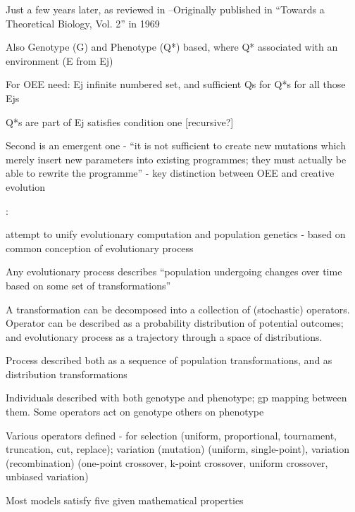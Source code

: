 Just a few years later, 
\autocite{Waddington2008} as reviewed in \autocite{Taylor:1999sc}--Originally published in ``Towards a Theoretical Biology, Vol. 2'' in 1969

Also Genotype (G) and Phenotype (Q*) based, where Q* associated with
an environment (E from Ej)

For OEE need: Ej infinite numbered set, and sufficient Qs for Q*s
for all those Ejs

Q*s are part of Ej satisfies condition one {[}recursive?{]}

Second is an emergent one - ``it is not sufficient to create new
mutations which merely insert new parameters into existing
programmes; they must actually be able to rewrite the programme''
- key distinction between OEE and creative evolution

\autocite{Paixao2015}:

	attempt to unify evolutionary computation and population genetics -
	based on common conception of evolutionary process


	Any evolutionary process describes ``population undergoing changes
	over time based on some set of transformations''

	A transformation can be decomposed into a collection of (stochastic)
	operators. Operator can be described as a probability distribution of
	potential outcomes; and evolutionary process as a trajectory through a
	space of distributions.
	
	Process described both as a sequence of population transformations,
	and as distribution transformations

	
	Individuals described with both genotype and phenotype; gp mapping
	between them. Some operators act on genotype others on phenotype

	
	Various operators defined - for selection (uniform, proportional,
	tournament, truncation, cut, replace); variation (mutation) (uniform,
	single-point), variation (recombination) (one-point crossover, k-point
	crossover, uniform crossover, unbiased variation)

	Most models satisfy five given mathematical properties
		
